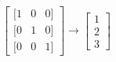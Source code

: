 \documentclass[10pt]{article}
\begin{document}
\[\begin{bmatrix} 
[1 & 0 & 0] \\
[0 & 1 & 0] \\
[0 & 0 & 1]
\end{bmatrix}
\rightarrow
\begin{bmatrix}
1\\
2\\
3
\end{bmatrix}\]
\end{document}
